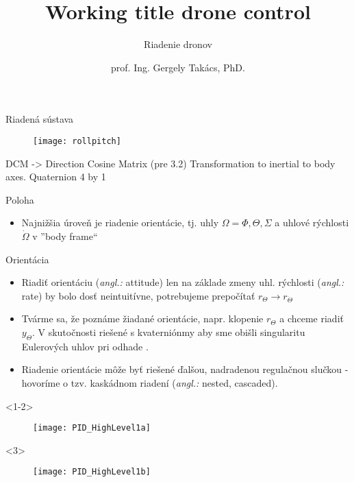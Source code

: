 \documentclass{beamer}
\title[Riadiace Algoritmy Dronov]
{Working title drone control}
\subtitle{\vspace{1em}Riadenie dronov}
\author[]{prof. Ing. Gergely Takács, PhD.}
\date[07.12.2021]{}
\newcommand{\angl}[1]{{\color{gray}(\emph{angl.:} #1)}}
\begin{document}



%

\begin{frame}{Riadená sústava}
\begin{figure}
\centering
  \texttt{[image: rollpitch]}\\
\end{figure}
\end{frame}


%
%


\begin{frame}
DCM -> Direction Cosine Matrix (pre 3.2)
Transformation to inertial to body axes.
Quaternion 4 by 1
\end{frame}


\begin{frame}[t]{Poloha}
\begin{itemize}
  \item<1-> Najnižšia úroveň je riadenie orientácie, tj. uhly $\Omega={\Phi, \Theta, \Sigma}$ a uhlové rýchlosti $\dot\Omega$ v ''body frame``
\end{itemize}
\end{frame}


\begin{frame}[t]{Orientácia}
\begin{itemize}
  \item<1-> Riadiť orientáciu \angl{attitude} len na základe zmeny uhl. rýchlosti \angl{rate} by bolo dosť neintuitívne, potrebujeme prepočítať $r_{\Theta} \rightarrow r_{\dot{\Theta}}$
  \item<2-> Tvárme sa, že poznáme žiadané orientácie, napr. klopenie $r_{\Theta}$ a chceme riadiť $y_{\Theta}$.  V skutočnosti riešené s kvaterniónmy aby sme obišli singularitu Eulerových uhlov pri odhade \citep{Erasmus2020}.
  \item<3-> Riadenie orientácie môže byť riešené ďalšou, nadradenou regulačnou slučkou - hovoríme o tzv. kaskádnom riadení \angl{nested, cascaded}.
  \end{itemize}


    \begin{onlyenv}<1-2>
  \begin{figure}
\centering
  \texttt{[image: PID\_HighLevel1a]}\\
\end{figure}
\end{onlyenv}



    \begin{onlyenv}<3>
  \begin{figure}
\centering
  \texttt{[image: PID\_HighLevel1b]}\\
\end{figure}
\end{onlyenv}

  \end{frame}
\end{document}
